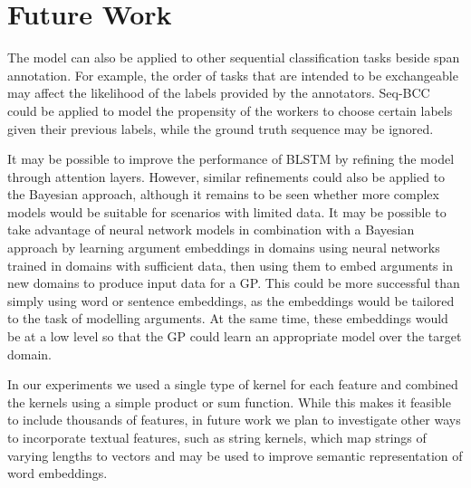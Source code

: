 \section{Future Work}

The model can also be applied to other sequential classification tasks beside span annotation.
For example, the order of tasks that are intended to be exchangeable may affect the likelihood
of the labels provided by the annotators\cite{mathur2017}. Seq-BCC could be applied to model the 
propensity of the workers to choose certain labels given their previous labels, while the 
ground truth sequence may be ignored.

It may be possible to improve the performance of BLSTM by refining the model through attention layers. However,  similar refinements could also be applied to the Bayesian approach, 
although it remains to be seen whether more complex models would be suitable for scenarios with limited data. 
It may be possible to take advantage of neural network models in combination with a Bayesian approach
by learning argument embeddings in domains using neural networks trained in domains with sufficient data, then 
using them to embed arguments in new domains to produce input data for a GP. This could be more successful than
simply using word or sentence embeddings, as the embeddings would be tailored to the task of modelling 
arguments. At the same time, these embeddings would be at a low level so that the GP could learn an appropriate model over the target domain.

In our experiments we used a single type of kernel for each feature and combined the kernels using a simple product or sum function.
While this makes it feasible to include thousands of features, in future work we plan to investigate other 
ways to incorporate textual features, such as string kernels, which map strings of varying lengths to vectors 
and may be used to improve semantic representation of word embeddings\cite{lodhi_text_2002}.
